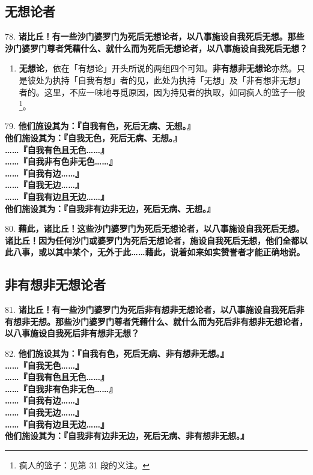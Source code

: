 \subsection{无想论者}

{\Large 78.} \textbf{诸比丘！有一些沙门婆罗门为死后无想论者，以八事施设自我死后无想。那些沙门婆罗门尊者凭藉什么、就什么而为死后无想论者，以八事施设自我死后无想？}

\begin{enumerate}\item \textbf{无想论}，依在「有想论」开头所说的两组四个可知。\textbf{非有想非无想论}亦然。只是彼处为执持「自我有想」者的见，此处为执持「无想」及「非有想非无想」者的。这里，不应一味地寻觅原因，因为持见者的执取，如同疯人的篮子一般\footnote{疯人的篮子：见第 31 段的义注。}。\end{enumerate}

{\Large 79.} \textbf{他们施设其为：『自我有色，死后无病、无想。』}\\
\textbf{他们施设其为：『自我无色，死后无病、无想。』}\\
\textbf{……『自我有色且无色……』}\\
\textbf{……『自我非有色非无色……』}\\
\textbf{……『自我有边……』}\\
\textbf{……『自我无边……』}\\
\textbf{……『自我有边且无边……』}\\
\textbf{他们施设其为：『自我非有边非无边，死后无病、无想。』}

{\Large 80.} \textbf{藉此，诸比丘！这些沙门婆罗门为死后无想论者，以八事施设自我死后无想。诸比丘！因为任何沙门或婆罗门为死后无想论者，施设自我死后无想，他们全都以此八事，或以其中某个，无外于此……藉此，说着如来如实赞誉者才能正确地说。}

\subsection{非有想非无想论者}

{\Large 81.} \textbf{诸比丘！有一些沙门婆罗门为死后非有想非无想论者，以八事施设自我死后非有想非无想。那些沙门婆罗门尊者凭藉什么、就什么而为死后非有想非无想论者，以八事施设自我死后非有想非无想？}

{\Large 82.} \textbf{他们施设其为：『自我有色，死后无病、非有想非无想。』}\\
\textbf{……『自我无色……』}\\
\textbf{……『自我有色且无色……』}\\
\textbf{……『自我非有色非无色……』}\\
\textbf{……『自我有边……』}\\
\textbf{……『自我无边……』}\\
\textbf{……『自我有边且无边……』}\\
\textbf{他们施设其为：『自我非有边非无边，死后无病、非有想非无想。』}

